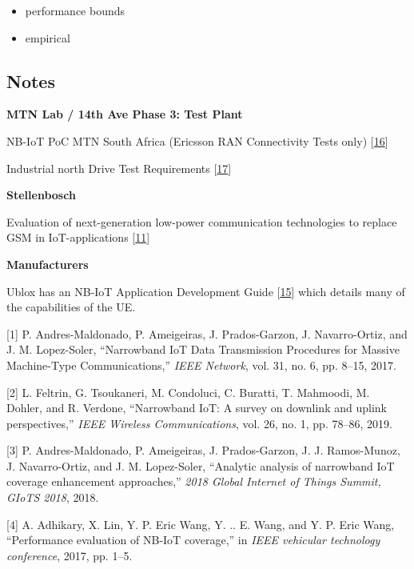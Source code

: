 \documentclass[]{article}
\providecommand{\tightlist}{%
  \setlength{\itemsep}{0pt}\setlength{\parskip}{0pt}}
\begin{document}
\begin{itemize}
\tightlist
\item
  performance bounds
\item
  empirical
\end{itemize}

\hypertarget{notes}{%
\subsection{Notes}\label{notes}}

\textbf{MTN Lab / 14th Ave Phase 3: Test Plant}

NB-IoT PoC MTN South Africa (Ericsson RAN Connectivity Tests only)
{[}\protect\hyperlink{ref-Ssengonzi2017}{16}{]}

Industrial north Drive Test Requirements
{[}\protect\hyperlink{ref-NorthDrive2017}{17}{]}

\textbf{Stellenbosch}

Evaluation of next-generation low-power communication technologies to
replace GSM in IoT-applications
{[}\protect\hyperlink{ref-Thomas2018}{11}{]}

\textbf{Manufacturers}

Ublox has an NB-IoT Application Development Guide
{[}\protect\hyperlink{ref-ubloxAppNote2018}{15}{]} which details many of
the capabilities of the UE.

\hypertarget{refs}{}
\leavevmode\hypertarget{ref-Andres-Maldonado2017}{}%
{[}1{]} P. Andres-Maldonado, P. Ameigeiras, J. Prados-Garzon, J.
Navarro-Ortiz, and J. M. Lopez-Soler, ``Narrowband IoT Data Transmission
Procedures for Massive Machine-Type Communications,'' \emph{IEEE
Network}, vol. 31, no. 6, pp. 8--15, 2017.

\leavevmode\hypertarget{ref-Feltrin2019}{}%
{[}2{]} L. Feltrin, G. Tsoukaneri, M. Condoluci, C. Buratti, T.
Mahmoodi, M. Dohler, and R. Verdone, ``Narrowband IoT: A survey on
downlink and uplink perspectives,'' \emph{IEEE Wireless Communications},
vol. 26, no. 1, pp. 78--86, 2019.

\leavevmode\hypertarget{ref-Andres-Maldonado2018b}{}%
{[}3{]} P. Andres-Maldonado, P. Ameigeiras, J. Prados-Garzon, J. J.
Ramos-Munoz, J. Navarro-Ortiz, and J. M. Lopez-Soler, ``Analytic
analysis of narrowband IoT coverage enhancement approaches,'' \emph{2018
Global Internet of Things Summit, GIoTS 2018}, 2018.

\leavevmode\hypertarget{ref-Adhikary2016}{}%
{[}4{]} A. Adhikary, X. Lin, Y. P. Eric Wang, Y. .. E. Wang, and Y. P.
Eric Wang, ``Performance evaluation of NB-IoT coverage,'' in \emph{IEEE
vehicular technology conference}, 2017, pp. 1--5.
\end{document}
